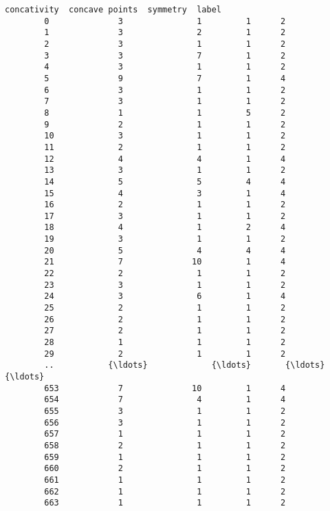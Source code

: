 \documentclass[11pt]{article}
\begin{document}
\begin{Verbatim}[commandchars=\\\{\}]
             concativity  concave points  symmetry  label  
        0              3               1         1      2  
        1              3               2         1      2  
        2              3               1         1      2  
        3              3               7         1      2  
        4              3               1         1      2  
        5              9               7         1      4  
        6              3               1         1      2  
        7              3               1         1      2  
        8              1               1         5      2  
        9              2               1         1      2  
        10             3               1         1      2  
        11             2               1         1      2  
        12             4               4         1      4  
        13             3               1         1      2  
        14             5               5         4      4  
        15             4               3         1      4  
        16             2               1         1      2  
        17             3               1         1      2  
        18             4               1         2      4  
        19             3               1         1      2  
        20             5               4         4      4  
        21             7              10         1      4  
        22             2               1         1      2  
        23             3               1         1      2  
        24             3               6         1      4  
        25             2               1         1      2  
        26             2               1         1      2  
        27             2               1         1      2  
        28             1               1         1      2  
        29             2               1         1      2  
        ..           {\ldots}             {\ldots}       {\ldots}    {\ldots}  
        653            7              10         1      4  
        654            7               4         1      4  
        655            3               1         1      2  
        656            3               1         1      2  
        657            1               1         1      2  
        658            2               1         1      2  
        659            1               1         1      2  
        660            2               1         1      2  
        661            1               1         1      2  
        662            1               1         1      2  
        663            1               1         1      2  

\end{Verbatim}
\end{document}
